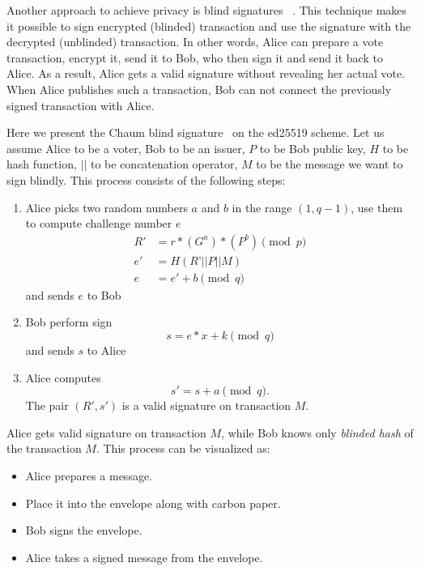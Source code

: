 \documentclass[applsci,article,submit,moreauthors,pdftex]{Definitions/mdpi}
\begin{document}
Another approach to achieve privacy is blind signatures ~\cite{applied_cryptography}. This technique makes it possible to sign encrypted (blinded) transaction and use the signature with the decrypted (unblinded) transaction. In other words, Alice can prepare a vote transaction, encrypt it, send it to Bob, who then sign it and send it back to Alice. As a result, Alice gets a valid signature without revealing her actual vote. When Alice publishes such a transaction, Bob can not connect the previously signed transaction with Alice. 

Here we present the Chaum blind signature~\cite{blindsignatureschaum} on the ed25519 scheme.
Let us assume Alice to be a voter, Bob to be an issuer, $P$ to be Bob public key, $H$ to be hash function, $\vert\vert$ to be concatenation operator, $M$ to be the message we want to sign blindly.
This process consists of the following steps:

\begin{enumerate}

\item Alice picks two random numbers $a$ and $b$ in the range $(1, q-1)$, use them to compute challenge number $e$
\begin{align}
R' &= r*(G^a)*(P^b) \pmod{p} \\
e' &= H(R’|| P || M) \\
e &= e' + b \pmod{q}
\end{align}
and sends $e$ to Bob

\item Bob perform sign
\begin{equation}
s = e*x + k \pmod{q}
\end{equation}
and sends $s$ to Alice

\item Alice computes 
\begin{equation}
s' = s + a \pmod{q}.
\end{equation} The pair $(R', s')$ is a valid signature on transaction $M$.
\end{enumerate}
Alice gets valid signature on transaction $M$, while Bob knows only \textit{blinded hash} of the transaction $M$.
This process can be visualized as:
\begin{itemize}
    \item Alice prepares a message.
    \item Place it into the envelope along with carbon paper.
    \item Bob signs the envelope.
    \item Alice takes a signed message from the envelope.
\end{itemize}
\end{document}
